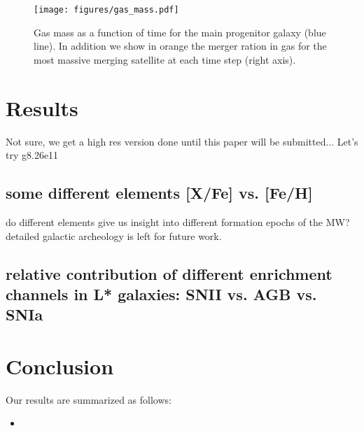 \documentclass[useAMS,usenatbib]{mnras}
\begin{document}
\begin{figure}
    \begin{centering}
        \texttt{[image: figures/gas\_mass.pdf]}
        \caption{
            Gas mass as a function of time for the main progenitor galaxy (blue line). In addition we show in orange the merger ration in gas for the most massive merging satellite at each time step (right axis).
        }
        \label{fig:merger_ratio}
    \end{centering}
\end{figure}




\section{Results} \label{sec:results}

Not sure, we get a high res version done until this paper will be submitted...
Let's try g8.26e11


\subsection{some different elements [X/Fe] vs. [Fe/H]}
do different elements give us insight into different formation epochs of the MW?
detailed galactic archeology is left for future work.

\subsection{relative contribution of different enrichment channels in L* galaxies: SNII vs. AGB vs. SNIa}


\section{Conclusion}
\label{sec:conclusion}



Our results are summarized as follows:
\begin{itemize}
%
\item 

\end{itemize}
\end{document}
